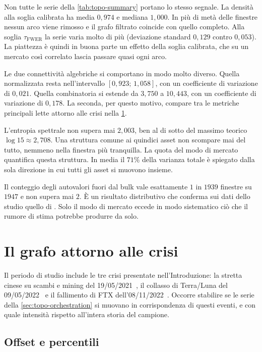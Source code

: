 Non tutte le serie della \cref{tab:topo-summary} portano lo stesso segnale. La densità alla soglia calibrata ha media $0{,}974$ e mediana $1{,}000$. In più di metà delle finestre nessun arco viene rimosso e il grafo filtrato coincide con quello completo. Alla soglia $\tau_{\mathrm{FWER}}$ la serie varia molto di più (deviazione standard $0{,}129$ contro $0{,}053$). La piattezza è quindi in buona parte un effetto della soglia calibrata, che su un mercato così correlato lascia passare quasi ogni arco.

Le due connettività algebriche si comportano in modo molto diverso. Quella normalizzata resta nell'intervallo $[0{,}923;\,1{,}058]$, con un coefficiente di variazione di $0{,}021$. Quella combinatoria si estende da $3{,}750$ a $10{,}443$, con un coefficiente di variazione di $0{,}178$. La seconda, per questo motivo, compare tra le metriche principali lette attorno alle crisi nella \cref{sec:topo-event-study}.

L'entropia spettrale non supera mai $2{,}003$, ben al di sotto del massimo teorico $\log 15\approx2{,}708$. Una struttura comune ai quindici asset non scompare mai del tutto, nemmeno nella finestra più tranquilla. La quota del modo di mercato quantifica questa struttura. In media il $71\%$ della varianza totale è spiegato dalla sola direzione in cui tutti gli asset si muovono insieme.

Il conteggio degli autovalori fuori dal bulk vale esattamente $1$ in $1939$ finestre su $1947$ e non supera mai $2$. È un risultato distributivo che conferma sui dati dello studio quello di \textcite{laloux1999noise}. Solo il modo di mercato eccede in modo sistematico ciò che il rumore di stima potrebbe produrre da solo.

\section{Il grafo attorno alle crisi}
\label{sec:topo-event-study}

Il periodo di studio include le tre crisi presentate nell'Introduzione: la stretta cinese su scambi e mining del 19/05/2021~\cite{griffith2023cryptocurrency}, il collasso di Terra/Luna del 09/05/2022~\cite{briola2023anatomy} e il fallimento di FTX dell'08/11/2022~\cite{akyildirim2023understanding}. Occorre stabilire se le serie della \cref{sec:topo-orchestration} si muovano in corrispondenza di questi eventi, e con quale intensità rispetto all'intera storia del campione.

\subsection{Offset e percentili}

